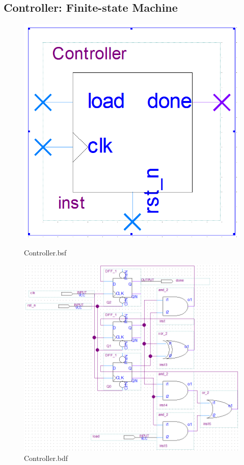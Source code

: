 \documentclass[12pt,a4paper]{article}
\begin{document}
  \subsection{Controller: Finite-state Machine}
  \begin{figure}[H]
    \centering
    \begin{subcaptionblock}{0.19\linewidth}
      \includegraphics[width=\linewidth]{Lab2_2/Controller_bsf.png}
      \caption{Controller.bsf}
    \end{subcaptionblock}
    \begin{subcaptionblock}{0.8\linewidth}
      \includegraphics[width=\linewidth]{Lab2_2/Controller_bdf.png}
      \caption{Controller.bdf}
    \end{subcaptionblock}
  \end{figure}
\end{document}

